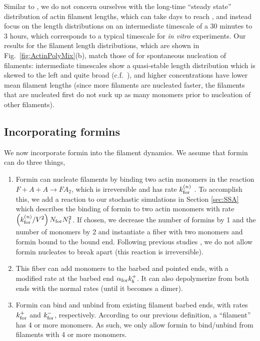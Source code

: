 \documentclass[11pt]{article}
\begin{document}
Similar to \cite{banerjee2022emergence}, we do not concern ourselves with the long-time ``steady state'' distribution of actin filament lengths, which can take days to reach \cite{hu2007theoretical, fass2008stochastic, mohapatra2017limiting}, and instead focus on the length distributions on an intermediate timescale of a 30 minutes to 3 hours, which corresponds to a typical timescale for \emph{in vitro} experiments. Our results for the filament length distributions, which are shown in Fig.\ \ref{fig:ActinPolyMix}(b), match those of \cite{banerjee2022emergence} for spontaneous nucleation of filaments: intermediate timescales show a quasi-stable length distribution which is skewed to the left and quite broad (c.f.\ \cite[Fig.~2c]{banerjee2022emergence}), and higher concentrations have lower mean filament lengths (since more filaments are nucleated faster, the filaments that are nucleated first do not suck up as many monomers prior to nucleation of other filaments). 

\subsection{Incorporating formins}
We now incorporate formin into the filament dynamics. We assume that formin can do three things,
\begin{enumerate}
\item Formin can nucleate filaments by binding two actin monomers in the reaction $F+A+A \rightarrow FA_2$, which is irreversible and has rate $k_\text{for}^{(n)}$ \cite{paul2008role, zweifel2021nucleation}. To accomplish this, we add a reaction to our stochastic simulations in Section \ref{sec:SSA} which describes the binding of formin to two actin monomers with rate $\left(k_\text{for}^{(n)}/V^2\right)N_\text{for}N_1^2 $. If chosen, we decrease the number of formins by 1 and the number of monomers by 2 and instantiate a fiber with two monomers and formin bound to the bound end. Following previous studies \cite{paul2008role, zweifel2021nucleation}, we do not allow formin nucleates to break apart (this reaction is irreversible). 
\item This fiber can add monomers to the barbed and pointed ends, with a modified rate at the barbed end $\alpha_\text{for} k_b^+$. It can also depolymerize from both ends with the normal rates (until it becomes a dimer).
\item Formin can bind and unbind from existing filament barbed ends, with rates $k_\text{for}^+$ and $k_\text{for}^-$, respectively. According to our previous definition, a ``filament'' has 4 or more monomers. As such, we only allow formin to bind/unbind from filaments with 4 or more monomers.
\end{enumerate}
\end{document}
